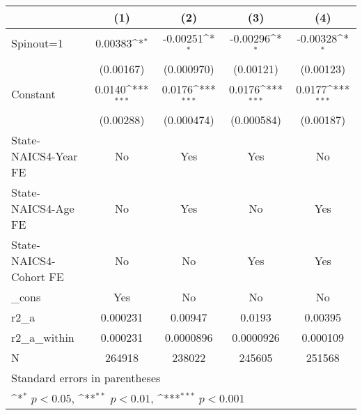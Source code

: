 {
\def\sym#1{\ifmmode^{#1}\else\(^{#1}\)\fi}
\begin{tabular}{l*{4}{c}}
\hline\hline
                    &\multicolumn{1}{c}{(1)}         &\multicolumn{1}{c}{(2)}         &\multicolumn{1}{c}{(3)}         &\multicolumn{1}{c}{(4)}         \\
\hline
Spinout=1           &     0.00383\sym{*}  &    -0.00251\sym{*}  &    -0.00296\sym{*}  &    -0.00328\sym{*}  \\
                    &   (0.00167)         &  (0.000970)         &   (0.00121)         &   (0.00123)         \\
[1em]
Constant            &      0.0140\sym{***}&      0.0176\sym{***}&      0.0176\sym{***}&      0.0177\sym{***}\\
                    &   (0.00288)         &  (0.000474)         &  (0.000584)         &   (0.00187)         \\
[1em]
State-NAICS4-Year FE&          No         &         Yes         &         Yes         &          No         \\
[1em]
State-NAICS4-Age FE &          No         &         Yes         &          No         &         Yes         \\
[1em]
State-NAICS4-Cohort FE&          No         &          No         &         Yes         &         Yes         \\
[1em]
\_cons              &         Yes         &          No         &          No         &          No         \\
\hline
r2\_a                &    0.000231         &     0.00947         &      0.0193         &     0.00395         \\
r2\_a\_within         &    0.000231         &   0.0000896         &   0.0000926         &    0.000109         \\
N                   &      264918         &      238022         &      245605         &      251568         \\
\hline\hline
\multicolumn{5}{l}{\footnotesize Standard errors in parentheses}\\
\multicolumn{5}{l}{\footnotesize \sym{*} \(p<0.05\), \sym{**} \(p<0.01\), \sym{***} \(p<0.001\)}\\
\end{tabular}
}

